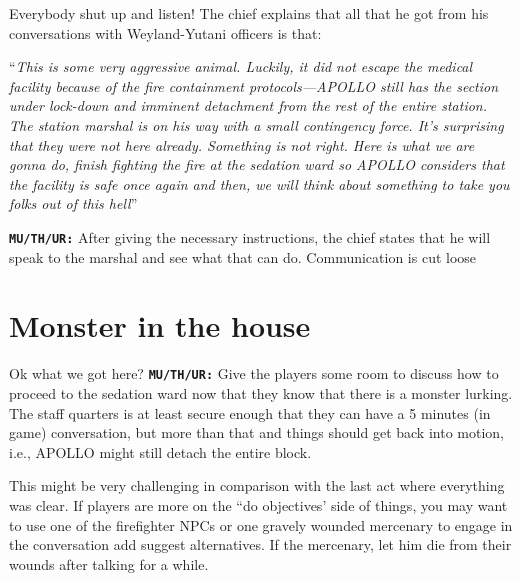 \begin{rpg-commentbox}{Everybody shut up and listen!}
   The chief explains that all that he got from his conversations with Weyland-Yutani officers is that:
   
   ``\textit{This is some very aggressive animal. Luckily, it did not escape the medical facility because of the fire containment protocols---APOLLO still has the section under lock-down and imminent detachment from the rest of the entire station. The station marshal is on his way with a small contingency force. It's surprising that they were not here already. Something is not right. Here is what we are gonna do, finish fighting the fire at the sedation ward so APOLLO considers that the facility is safe once again and then, we will think about something to take you folks out of this hell}''

   \texttt{\textbf{MU/TH/UR:}} After giving the necessary instructions, the chief states that he will speak to the marshal and see what that can do. Communication is cut loose 
\end{rpg-commentbox}



\clearpage


\section{Monster in the house}

\begin{rpg-commentbox}{Ok what we got here?}
   \texttt{\textbf{MU/TH/UR:}} Give the players some room to discuss how to proceed to the sedation ward now that they know that there is a monster lurking. The staff quarters is at least secure enough that they can have a 5 minutes (in game) conversation, but more than that and things should get back into motion, i.e., APOLLO might still detach the entire block.

   This might be very challenging in comparison with the last act where everything was clear. If players are more on the ``do objectives' side of things, you may want to use one of the firefighter NPCs or one gravely wounded mercenary to engage in the conversation add suggest alternatives. If the mercenary, let him die from their wounds after talking for a while.
\end{rpg-commentbox}




